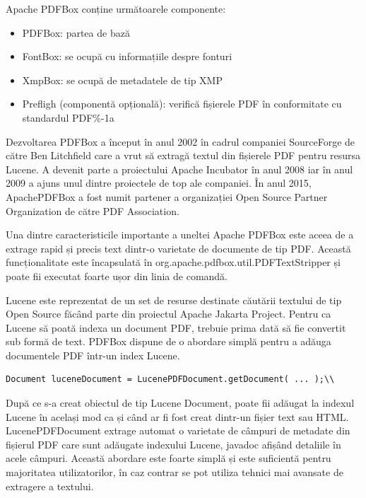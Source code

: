 \documentclass[12pt]{book}
\begin{document}
Apache PDFBox conține următoarele componente:
\begin{addmargin}[4em]{1em}
	\begin{itemize}
		\item PDFBox: partea de bază
		\item FontBox: se ocupă cu informațiile despre fonturi
		\item XmpBox: se ocupă de metadatele de tip XMP
		\item Prefligh (componentă opțională): verifică fișierele PDF în conformitate cu standardul PDF\%-1a \cite{PDFBoxOfficial}
\end{itemize}
\end{addmargin}

Dezvoltarea PDFBox a început în anul 2002 în cadrul companiei SourceForge de către Ben Litchfield care a vrut să extragă textul din fișierele PDF pentru resursa Lucene. A devenit parte a proiectului Apache Incubator în anul 2008 iar în anul 2009 a ajuns unul dintre proiectele de top ale companiei. În anul 2015, ApachePDFBox a fost numit partener a organizației Open Source Partner Organization de către PDF Association.

Una dintre caracteristicile importante a uneltei Apache PDFBox este aceea de a extrage rapid și precis text dintr-o varietate de documente de tip PDF. Această funcționalitate este încapsulată în org.apache.pdfbox.util.PDFTextStripper și poate fii executat foarte ușor din linia de comandă. 

Lucene este reprezentat de un set de resurse destinate căutării textului de tip Open Source făcând parte din proiectul Apache Jakarta Project. Pentru ca Lucene să poată indexa un document PDF, trebuie prima dată să fie convertit sub formă de text. PDFBox dispune de o abordare simplă pentru a adăuga documentele PDF într-un index Lucene.

\begin{lstlisting}[frame=single, caption=Adăugarea documentelor PDF într-un index Lucene]
Document luceneDocument = LucenePDFDocument.getDocument( ... );\\
\end{lstlisting}

După ce s-a creat obiectul de tip Lucene Document, poate fii adăugat la indexul Lucene în același mod ca și când ar fi fost creat dintr-un fișier text sau HTML. LucenePDFDocument extrage automat o varietate de câmpuri de metadate din fișierul PDF care sunt adăugate indexului Lucene, javadoc afișând detaliile în acele câmpuri. Această abordare este foarte simplă și este suficientă pentru majoritatea utilizatorilor, în caz contrar se pot utiliza tehnici mai avansate de extragere a textului.\cite{PDFBoxOfficial}
\end{document}
